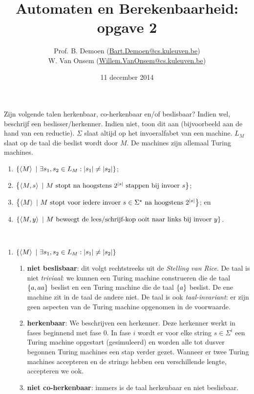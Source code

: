 \documentclass{article}
\title{Automaten en Berekenbaarheid:\\opgave 2}
\author{Prof. B. Demoen (\url{Bart.Demoen@cs.kuleuven.be})\\ W. Van Onsem (\url{Willem.VanOnsem@cs.kuleuven.be})}
\date{11 december 2014}
\begin{document}
\maketitle
\richtlijnen{}

\begin{question}[Berekenbaarheid]
Zijn volgende talen herkenbaar, co-herkenbaar en/of beslisbaar? Indien wel, beschrijf een beslisser/herkenner. Indien niet, toon dit aan (bijvoorbeeld aan de hand van een reductie). $\Sigma$ slaat altijd op het invoeralfabet van een machine. $L_M$ slaat op de taal die beslist wordt door $M$. De machines zijn allemaal Turing machines.
\begin{enumerate}
 \item $\left\{ \left\langle M \right\rangle\ |\ \exists s_1,s_2\in L_M:\left|s_1\right|\neq\left|s_2\right| \right\}$;
 \item $\left\{ \left\langle M,s \right\rangle\ |\ \mbox{$M$ stopt na hoogstens $2^{\left|s\right|}$ stappen bij invoer $s$} \right\}$;
 \item $\left\{ \left\langle M \right\rangle\ |\ \mbox{$M$ stopt voor iedere invoer $s\in\Sigma^{\star}$ na hoogstens $2^{\left|s\right|}$} \right\}$; en
 \item $\left\{ \left\langle M,y \right\rangle\ |\ \mbox{$M$ beweegt de lees/schrijf-kop ooit naar links bij invoer $y$} \right\}$.
\end{enumerate}
\begin{answer}~~
\begin{enumerate}
 \item $\left\{ \left\langle M \right\rangle\ |\ \exists s_1,s_2\in L_M:\left|s_1\right|\neq\left|s_2\right| \right\}$
 \begin{enumerate}
  \item \textbf{niet beslisbaar}: dit volgt rechtstreeks uit de \emph{Stelling van Rice}. De taal is niet \emph{triviaal}: we kunnen een Turing machine construeren die de taal $\left\{ a,aa \right\}$ beslist en een Turing machine die de taal $\left\{ a \right\}$ beslist. De ene machine zit in de taal de andere niet. De taal is ook \emph{taal-invariant}: er zijn geen aspecten van de Turing machine opgenomen in de voorwaarde.
  \item \textbf{herkenbaar}: We beschrijven een herkenner. Deze herkenner werkt in fases beginnend met fase $0$. In fase $i$ wordt er voor elke string $s\in\Sigma^i$ een Turing machine opgestart (gesimuleerd) en worden alle tot dusver begonnen Turing machines een stap verder gezet. Wanneer er twee Turing machines accepteren en de strings hebben een verschillende lengte, accepteren we ook.
  \item \textbf{niet co-herkenbaar}: immers is de taal herkenbaar en niet beslisbaar.

\end{enumerate}
\end{enumerate}
\end{answer}
\end{question}
\end{document}
